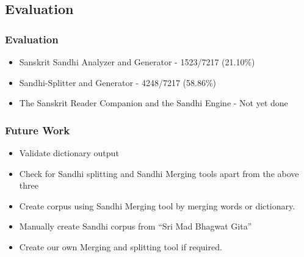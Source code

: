 \documentclass[xcolor=dvipsnames]{beamer}
\begin{document}

\subsection{Evaluation}
\begin{frame}
\frametitle{Evaluation}
\begin{itemize}

\item Sanskrit Sandhi Analyzer and Generator - 1523/7217 (21.10\%)

\item Sandhi-Splitter and Generator - 4248/7217 (58.86\%)

 \item The Sanskrit Reader Companion and the Sandhi Engine - Not yet done

\end{itemize}
\end{frame}

\begin{frame}
\frametitle{Future Work}
\begin{itemize}
\item Validate dictionary output
\item Check for Sandhi splitting and Sandhi Merging tools apart from the above three
\item Create corpus using Sandhi Merging tool by merging words or dictionary.
\item Manually create Sandhi corpus from ``Sri Mad Bhagwat Gita''
\item Create our own Merging and splitting tool if required.
\end{itemize}
\end{frame}
\end{document}
